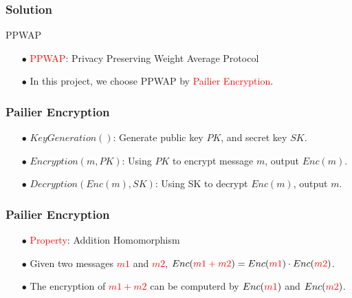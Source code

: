 \documentclass[xcolor=table]{beamer}
\newcommand{\red}[1]{\textcolor{red}{#1}}
\begin{document}
\begin{frame}
\frametitle{Solution}


\begin{block}{PPWAP}
\vspace{4 mm}
\begin{itemize} \itemsep6pt \parskip0pt 
  \item[$\bullet$] \red{PPWAP}: Privacy Preserving Weight Average Protocol
\end{itemize}

\end{block}


\begin{block}{}
\begin{itemize} \itemsep6pt \parskip0pt 
  \item[$\bullet$] In this project, we choose PPWAP by \red{Pailier Encryption}.
\end{itemize}

\end{block}
\end{frame}

\begin{frame}
\frametitle{Pailier Encryption}

\begin{itemize} \itemsep25pt \parskip0pt 
  \item[$\bullet$] $KeyGeneration()$: Generate public key $PK$, and secret key $SK$.
  \item[$\bullet$] $Encryption(m, PK)$: Using $PK$ to encrypt message $m$, output $Enc(m)$.
  \item[$\bullet$] $Decryption(Enc(m), SK)$: Using SK to decrypt $Enc(m)$, output $m$.
\end{itemize}

\end{frame}

\begin{frame}
\frametitle{Pailier Encryption}

\begin{itemize} \itemsep20pt \parskip0pt 
  \item[$\bullet$] \red{Property}: Addition Homomorphism
  \item[$\bullet$] Given two messages \red{$m1$} and \red{$m2$}, $Enc(\color{red}{m1+m2}\color{black}{)} = Enc(\color{red}{m1}\color{black}{)} \cdot Enc(\color{red}{m2}\color{black}{)}$.
  \item[$\bullet$] The encryption of \red{$m1+m2$} can be computerd by $Enc(\color{red}{m1}\color{black}{)}$ and $Enc(\color{red}{m2}\color{black}{)}$.
\end{itemize}

\end{frame}
\end{document}
